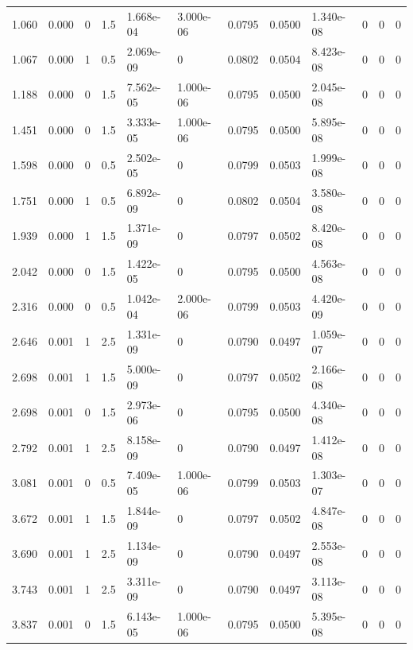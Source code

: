 \documentclass[preview]{standalone}
\begin{document}
{{\begin{tabular}{L{1.2cm}C{1.2cm} C{0.3cm}C{0.5cm} C{1.4cm}C{1.4cm} C{1.4cm}C{1.4cm} C{1.6cm}C{1.6cm} C{1.6cm}C{1.6cm}}
  1.060  &  0.000  & 0     & 1.5 &  1.668e-04  & 3.000e-06  &  0.0795&   0.0500& 1.340e-08 & 0   &  0 & 0  \\ 
  1.067  &  0.000  & 1     & 0.5 &  2.069e-09  & 0  &  0.0802&   0.0504& 8.423e-08 & 0   &  0 & 0  \\ 
  1.188  &  0.000  & 0     & 1.5 &  7.562e-05  & 1.000e-06  &  0.0795&   0.0500& 2.045e-08 & 0   &  0 & 0  \\ 
  1.451  &  0.000  & 0     & 1.5 &  3.333e-05  & 1.000e-06  &  0.0795&   0.0500& 5.895e-08 & 0   &  0 & 0  \\ 
  1.598  &  0.000  & 0     & 0.5 &  2.502e-05  & 0  &  0.0799&   0.0503& 1.999e-08 & 0   &  0 & 0  \\ 
  1.751  &  0.000  & 1     & 0.5 &  6.892e-09  & 0  &  0.0802&   0.0504& 3.580e-08 & 0   &  0 & 0  \\ 
  1.939  &  0.000  & 1     & 1.5 &  1.371e-09  & 0  &  0.0797&   0.0502& 8.420e-08 & 0   &  0 & 0  \\ 
  2.042  &  0.000  & 0     & 1.5 &  1.422e-05  & 0  &  0.0795&   0.0500& 4.563e-08 & 0   &  0 & 0  \\ 
  2.316  &  0.000  & 0     & 0.5 &  1.042e-04  & 2.000e-06  &  0.0799&   0.0503& 4.420e-09 & 0   &  0 & 0  \\ 
  2.646  &  0.001  & 1     & 2.5 &  1.331e-09  & 0  &  0.0790&   0.0497& 1.059e-07 & 0   &  0 & 0  \\ 
  2.698  &  0.001  & 1     & 1.5 &  5.000e-09  & 0  &  0.0797&   0.0502& 2.166e-08 & 0   &  0 & 0  \\ 
  2.698  &  0.001  & 0     & 1.5 &  2.973e-06  & 0  &  0.0795&   0.0500& 4.340e-08 & 0   &  0 & 0  \\ 
  2.792  &  0.001  & 1     & 2.5 &  8.158e-09  & 0  &  0.0790&   0.0497& 1.412e-08 & 0   &  0 & 0  \\ 
  3.081  &  0.001  & 0     & 0.5 &  7.409e-05  & 1.000e-06  &  0.0799&   0.0503& 1.303e-07 & 0   &  0 & 0  \\ 
  3.672  &  0.001  & 1     & 1.5 &  1.844e-09  & 0  &  0.0797&   0.0502& 4.847e-08 & 0   &  0 & 0  \\ 
  3.690  &  0.001  & 1     & 2.5 &  1.134e-09  & 0  &  0.0790&   0.0497& 2.553e-08 & 0   &  0 & 0  \\ 
  3.743  &  0.001  & 1     & 2.5 &  3.311e-09  & 0  &  0.0790&   0.0497& 3.113e-08 & 0   &  0 & 0  \\ 
  3.837  &  0.001  & 0     & 1.5 &  6.143e-05  & 1.000e-06  &  0.0795&   0.0500& 5.395e-08 & 0   &  0 & 0  \\ 

\end{tabular}}}
\end{document}
